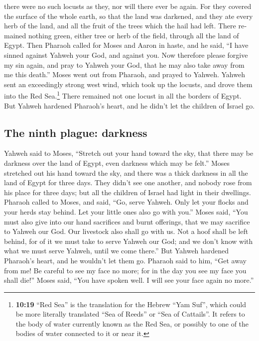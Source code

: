 \begin{paracol}{2}
\begin{otherlanguage}{english}
there were no such locusts as they, nor will there ever be again.
 For they covered the surface of the whole earth, so that
the land was darkened, and they ate every herb of the land, and all the
fruit of the trees which the hail had left. There remained nothing
green, either tree or herb of the field, through all the land of Egypt.
 Then Pharaoh called for Moses and Aaron in haste, and he
said, ``I have sinned against Yahweh your God, and against you.
 Now therefore please forgive my sin again, and pray to
Yahweh your God, that he may also take away from me this death.''
 Moses went out from Pharaoh, and prayed to Yahweh.
 Yahweh sent an exceedingly strong west wind, which took
up the locusts, and drove them into the Red Sea.\footnote{\textbf{10:19}
  ``Red Sea'' is the translation for the Hebrew ``Yam Suf'', which could
  be more literally translated ``Sea of Reeds'' or ``Sea of Cattails''.
  It refers to the body of water currently known as the Red Sea, or
  possibly to one of the bodies of water connected to it or near it.}
There remained not one locust in all the borders of Egypt.
 But Yahweh hardened Pharaoh's heart, and he didn't let
the children of Israel go.

\hypertarget{the-ninth-plague-darkness}{%
\subsection{The ninth plague:
darkness}\label{the-ninth-plague-darkness}}

 Yahweh said to Moses, ``Stretch out your hand toward the
sky, that there may be darkness over the land of Egypt, even darkness
which may be felt.''  Moses stretched out his hand toward
the sky, and there was a thick darkness in all the land of Egypt for
three days.  They didn't see one another, and nobody rose
from his place for three days; but all the children of Israel had light
in their dwellings.  Pharaoh called to Moses, and said,
``Go, serve Yahweh. Only let your flocks and your herds stay behind. Let
your little ones also go with you.''  Moses said, ``You
must also give into our hand sacrifices and burnt offerings, that we may
sacrifice to Yahweh our God.  Our livestock also shall go
with us. Not a hoof shall be left behind, for of it we must take to
serve Yahweh our God; and we don't know with what we must serve Yahweh,
until we come there.''  But Yahweh hardened Pharaoh's
heart, and he wouldn't let them go.  Pharaoh said to him,
``Get away from me! Be careful to see my face no more; for in the day
you see my face you shall die!''  Moses said, ``You have
spoken well. I will see your face again no more.''


\end{otherlanguage}
\end{paracol}
